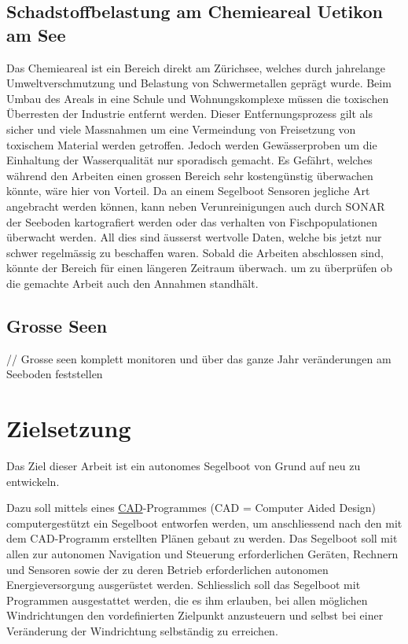 \subsection{Schadstoffbelastung am Chemieareal Uetikon am See}
Das Chemieareal ist ein Bereich direkt am Zürichsee, welches durch jahrelange Umweltverschmutzung und Belastung von Schwermetallen geprägt wurde. Beim Umbau des Areals in eine Schule und Wohnungskomplexe müssen die toxischen Überresten der Industrie entfernt werden. Dieser Entfernungsprozess gilt als sicher und viele Massnahmen um eine Vermeindung von Freisetzung von toxischem Material werden getroffen. Jedoch werden Gewässerproben um die Einhaltung der Wasserqualität nur sporadisch gemacht. Es Gefährt, welches während den Arbeiten einen grossen Bereich sehr kostengünstig überwachen könnte, wäre hier von Vorteil. Da an einem Segelboot Sensoren jegliche Art angebracht werden können, kann neben Verunreinigungen auch durch SONAR der Seeboden kartografiert werden oder das verhalten von Fischpopulationen überwacht werden. All dies sind äusserst wertvolle Daten, welche bis jetzt nur schwer regelmässig zu beschaffen waren. Sobald die Arbeiten abschlossen sind, könnte der Bereich für einen längeren Zeitraum überwach. um zu überprüfen ob die gemachte Arbeit auch den Annahmen standhält.

\subsection{Grosse Seen}
// Grosse seen komplett monitoren und über das ganze Jahr veränderungen am Seeboden feststellen

\section{Zielsetzung}
Das Ziel dieser Arbeit ist ein autonomes Segelboot von Grund auf neu zu entwickeln. 

Dazu soll mittels eines \href{https://www.overleaf.com/project/64c425dc65e5d82bb7de603c\#_bookmark0}{CAD}-Programmes (CAD = Computer Aided Design) computergestützt ein Segelboot entworfen werden, um anschliessend nach den mit dem CAD-Programm erstellten Plänen gebaut zu werden. Das Segelboot soll mit allen zur autonomen Navigation und Steuerung erforderlichen Geräten, Rechnern und Sensoren sowie der zu deren Betrieb erforderlichen autonomen Energieversorgung ausgerüstet werden. Schliesslich soll das Segelboot mit Programmen ausgestattet werden, die es ihm erlauben, bei allen möglichen Windrichtungen den vordefinierten Zielpunkt anzusteuern und selbst bei einer Veränderung der Windrichtung selbständig zu erreichen.

